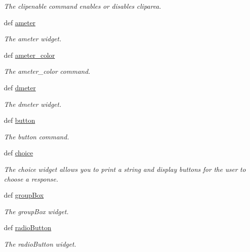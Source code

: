\begin{DoxyCompactItemize}
\begin{DoxyCompactList}\small\item\em The clipenable command enables or disables cliparea. \end{DoxyCompactList}\item 
def \hyperlink{group___widgets_ga01020dc360dfbd9f463bf5478e42566e}{ameter}
\begin{DoxyCompactList}\small\item\em The ameter widget. \end{DoxyCompactList}\item 
def \hyperlink{group___widgets_ga87633e350f72285b45b9df28eff6ba18}{ameter\-\_\-color}
\begin{DoxyCompactList}\small\item\em The ameter\-\_\-color command. \end{DoxyCompactList}\item 
def \hyperlink{group___widgets_gaa521dbc7f8860a624135caaa58ba516d}{dmeter}
\begin{DoxyCompactList}\small\item\em The dmeter widget. \end{DoxyCompactList}\item 
def \hyperlink{group___widgets_ga7eeeb3ce522c7891c3f76cdc79f11192}{button}
\begin{DoxyCompactList}\small\item\em The button command. \end{DoxyCompactList}\item 
def \hyperlink{group___widgets_gad1b05a5ee17690c241c30b6a15437c8b}{choice}
\begin{DoxyCompactList}\small\item\em The choice widget allows you to print a string and display buttons for the user to choose a response. \end{DoxyCompactList}\item 
def \hyperlink{group___widgets_ga794dde0f8237dcfcd90646e0eeb2ca65}{group\-Box}
\begin{DoxyCompactList}\small\item\em The group\-Box widget. \end{DoxyCompactList}\item 
def \hyperlink{group___widgets_gaeb3dc4a2ae0923d39259c6583b4ed240}{radio\-Button}
\begin{DoxyCompactList}\small\item\em The radio\-Button widget. \end{DoxyCompactList}\item 

\end{DoxyCompactItemize}
